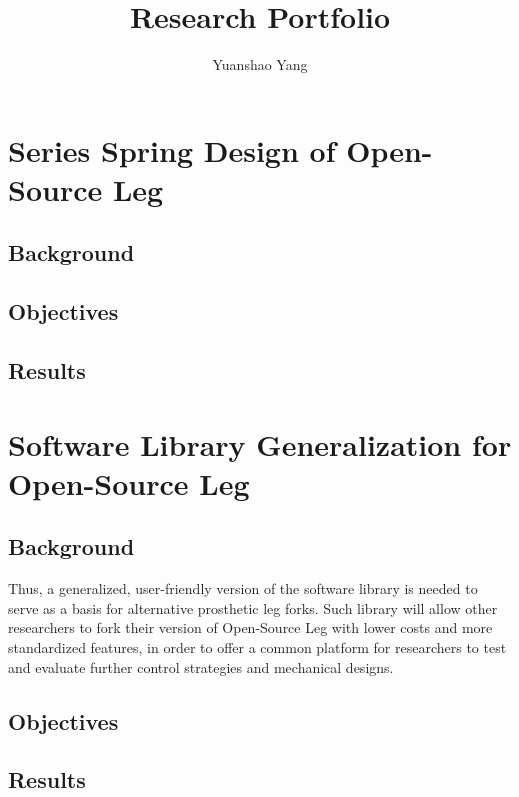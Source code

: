 \documentclass[12pt]{article}
\title{Research Portfolio}
\author{Yuanshao Yang}
\begin{document}
\maketitle


\tableofcontents
\newpage

\section{Series Spring Design of Open-Source Leg}

\subsection{Background}

\subsection{Objectives}

\subsection{Results}


\section{Software Library Generalization for Open-Source Leg}


\subsection{Background}



Thus, a generalized, user-friendly version of the software library is needed to serve as a basis for alternative prosthetic leg forks. Such library will allow other researchers to fork their version of Open-Source Leg with lower costs and more standardized features, in order to offer a common platform for researchers to test and evaluate further control strategies and mechanical designs.



\subsection{Objectives}

\subsection{Results}
\end{document}
